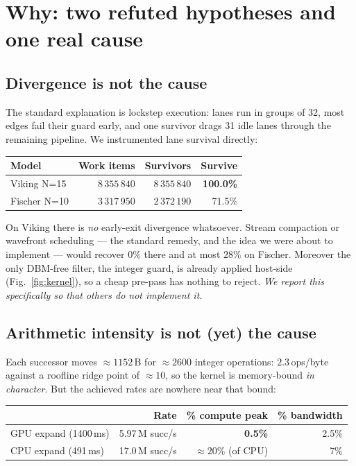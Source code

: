 \section{Why: two refuted hypotheses and one real cause}
\label{sec:why}

\subsection{Divergence is not the cause}

The standard explanation is lockstep execution: lanes run in groups of 32, most edges fail
their guard early, and one survivor drags 31 idle lanes through the remaining pipeline. We
instrumented lane survival directly:

\begin{center}
\begin{tabular}{lrrr}
\toprule
Model & Work items & Survivors & Survive \\
\midrule
Viking N=15 & $8\,355\,840$ & $8\,355\,840$ & \textbf{100.0\%} \\
Fischer N=10 & $3\,317\,950$ & $2\,372\,190$ & 71.5\% \\
\bottomrule
\end{tabular}
\end{center}

On Viking there is \emph{no} early-exit divergence whatsoever. Stream compaction or wavefront
scheduling --- the standard remedy, and the idea we were about to implement --- would recover
$0\%$ there and at most $28\%$ on Fischer. Moreover the only DBM-free filter, the integer
guard, is already applied host-side (Fig.~\ref{fig:kernel}), so a cheap pre-pass has nothing
to reject. \emph{We report this specifically so that others do not implement it.}

\subsection{Arithmetic intensity is not (yet) the cause}

Each successor moves ${\approx}1152$\,B for ${\approx}2600$ integer operations:
$2.3$\,ops/byte against a roofline ridge point of ${\approx}10$, so the kernel is memory-bound
\emph{in character}. But the achieved rates are nowhere near that bound:

\begin{center}
\begin{tabular}{lrrr}
\toprule
& Rate & \% compute peak & \% bandwidth \\
\midrule
GPU expand (1400\,ms) & 5.97\,M succ/s & \textbf{0.5\%} & 2.5\% \\
CPU expand (491\,ms) & 17.0\,M succ/s & ${\approx}20\%$ (of CPU) & 7\% \\
\bottomrule
\end{tabular}
\end{center}

